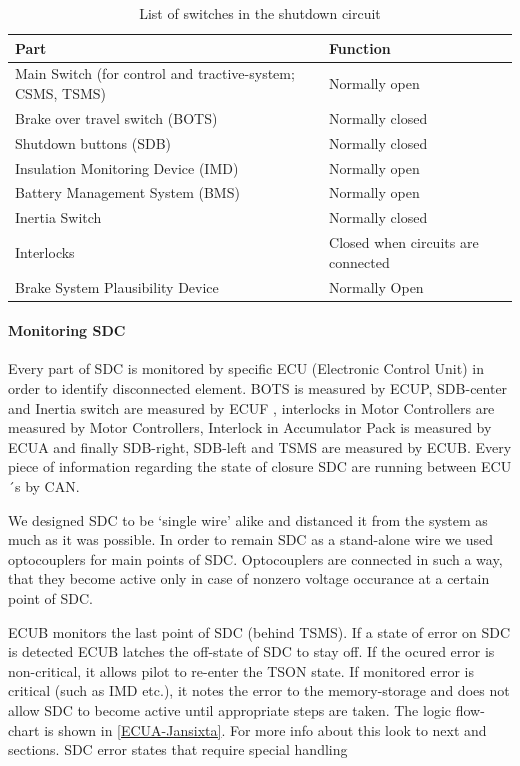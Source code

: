 \begin{table}[H]
	\caption{List of switches in the shutdown circuit}
	\centering
	\begin{tabularx}{\textwidth}{|X|l|}
		\hline Part  & Function \\[\TableSize]
		\hline Main Switch (for control and tractive-system; CSMS, TSMS) & Normally open \\[\TableSize]
		\hline Brake over travel switch (BOTS) & Normally closed \\[\TableSize]
		\hline Shutdown buttons (SDB) & Normally closed \\[\TableSize]
		\hline Insulation Monitoring Device (IMD) & Normally open \\[\TableSize]
		\hline Battery Management System (BMS) & Normally open \\[\TableSize]
		\hline Inertia Switch & Normally closed \\[\TableSize]
		\hline Interlocks & Closed when circuits are connected \\[\TableSize]
		\hline Brake System Plausibility Device & Normally Open \\[\TableSize]
		\hline
	\end{tabularx}%
	\label{tab:SDCswitch}%
\end{table}%


\paragraph{Monitoring SDC}
Every part of SDC is monitored by specific ECU (Electronic Control Unit) in order to identify disconnected element. BOTS is measured by ECUP, SDB-center  and Inertia switch are measured by ECUF , interlocks in Motor Controllers are measured by Motor Controllers, Interlock in Accumulator Pack is measured by ECUA  and finally SDB-right, SDB-left and TSMS   are measured by ECUB. Every piece of information regarding the state of closure SDC are running between ECU´s by CAN. 

We designed SDC to be ‘single wire’ alike and distanced it from the system as much as it was possible. In order to remain SDC as a stand-alone wire we used optocouplers for main points of SDC. Optocouplers are connected in such a way, that they become active only in case of nonzero voltage occurance at a certain point of SDC.

ECUB monitors the last point of SDC (behind TSMS). If a state of error on SDC is detected ECUB latches the off-state of SDC to stay off. If the ocured error is non-critical, it allows pilot to re-enter the TSON state. If monitored error is critical (such as IMD etc.), it notes the error to the memory-storage and does not allow SDC to become active until appropriate steps are taken. The logic flow-chart is shown in \ref{ECUA-Jansixta}. For more info about this look to next and  sections. SDC error states that require special handling

